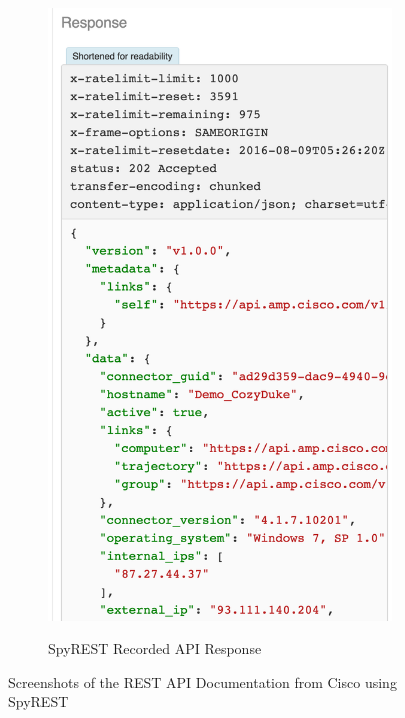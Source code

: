 \begin{figure}
\begin{subfigure}[t]{0.5\textwidth}
{      \includegraphics[keepaspectratio, width=\textwidth]{response.png}
    }
    \caption{SpyREST Recorded API Response}
    \label{fig:screenshot_response}
  \end{subfigure}

  \caption{Screenshots of the REST API Documentation from Cisco using SpyREST}
  \label{fig:screenshot}
\end{figure}

